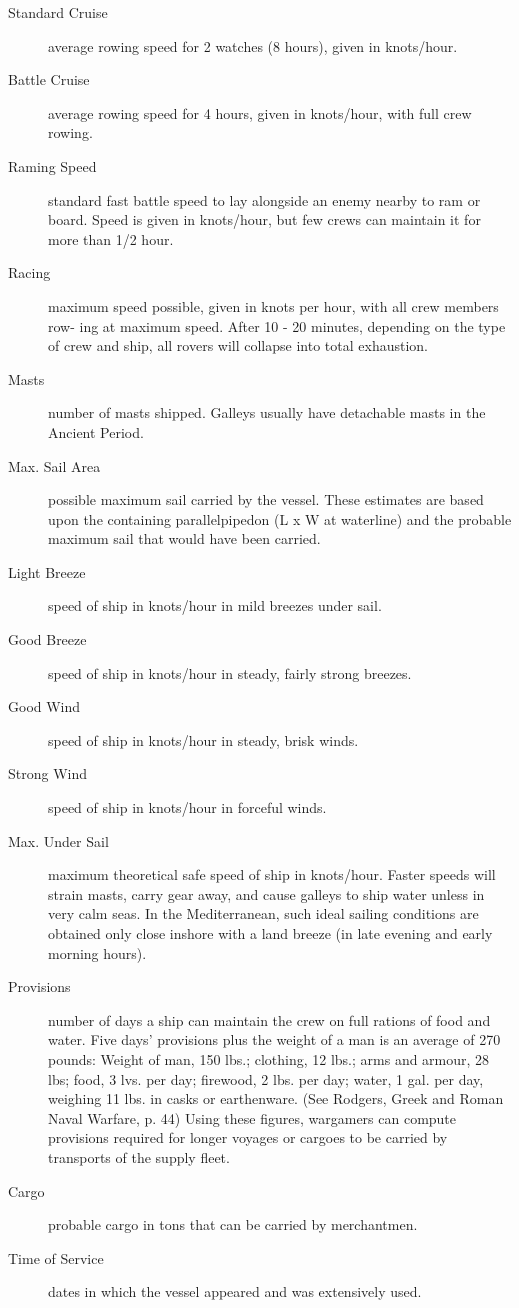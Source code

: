 \documentclass{article}
\begin{document}
\begin{description}
\item[Standard Cruise] average rowing speed for 2 watches (8 hours),
  given in knots/hour.

\item[Battle Cruise] average rowing speed for 4 hours, given in
   knots/hour, with full crew rowing.

\item[Raming Speed] standard fast battle speed to lay alongside an
  enemy nearby to ram or board.  Speed is given in knots/hour, but few
  crews can maintain it for more than 1/2 hour.

\item[Racing] maximum speed possible, given in knots per hour, with
  all crew members row- ing at maximum speed.  After 10 - 20 minutes,
  depending on the type of crew and ship, all rovers will collapse
  into total exhaustion.

\item[Masts] number of masts shipped.  Galleys usually have detachable
  masts in the Ancient Period.

\item[Max. Sail Area] possible maximum sail carried by the vessel.
  These estimates are based upon the containing parallelpipedon (L x W
  at waterline) and the probable maximum sail that would have been
  carried.

\item[Light Breeze] speed of ship in knots/hour in mild breezes under
  sail.

\item[Good Breeze] speed of ship in knots/hour in steady, fairly
  strong breezes.

\item[Good Wind] speed of ship in knots/hour in steady, brisk winds.

\item[Strong Wind] speed of ship in knots/hour in forceful winds.

\item[Max. Under Sail] maximum theoretical safe speed of ship in
  knots/hour.  Faster speeds will strain masts, carry gear away, and
  cause galleys to ship water unless in very calm seas.  In the
  Mediterranean, such ideal sailing conditions are obtained only close
  inshore with a land breeze (in late evening and early morning
  hours).

\item[Provisions] number of days a ship can maintain the crew on full
  rations of food and water.  Five days' provisions plus the weight of
  a man is an average of 270 pounds: Weight of man, 150 lbs.;
  clothing, 12 lbs.; arms and armour, 28 lbs; food, 3 lvs. per day;
  firewood, 2 lbs. per day; water, 1 gal. per day, weighing 11 lbs. in
  casks or earthenware.  (See Rodgers, Greek and Roman Naval Warfare,
  p. 44) Using these figures, wargamers can compute provisions
  required for longer voyages or cargoes to be carried by transports
  of the supply fleet.

\item[Cargo] probable cargo in tons that can be carried by
  merchantmen.

\item[Time of Service] dates in which the vessel appeared and was
  extensively used.

\end{description}
\end{document}
